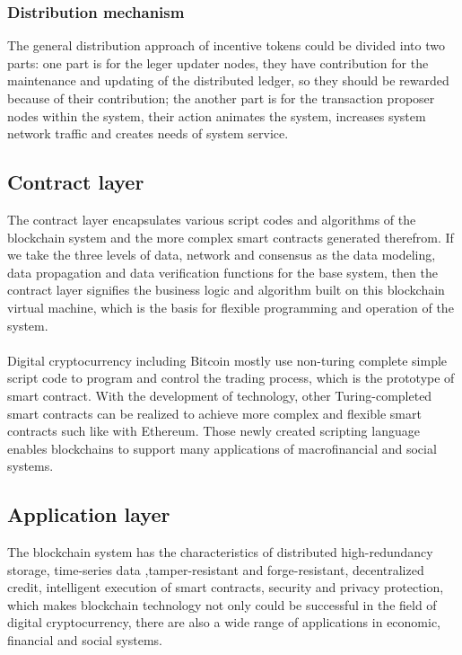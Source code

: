 \documentclass[doublespacing]{bmcart}
\begin{document}
\begin{CJK*}{UTF8}{gbsn}
\subsubsection*{Distribution mechanism}
The general distribution approach of incentive tokens could be divided into two parts: one part is for the leger updater nodes, they have contribution for the maintenance and updating of the distributed ledger, so they should be rewarded because of their contribution; the another part is for the transaction proposer nodes within the system, their action animates the system, increases system network traffic and creates needs of system service. 
\subsection{Contract layer}
The contract layer encapsulates various script codes and algorithms of the blockchain system and the more complex smart contracts generated therefrom. If we take the three levels of data, network and consensus as the data modeling, data propagation and data verification functions for the base system, then the contract layer signifies the business logic and algorithm built on this blockchain virtual machine, which is the basis for flexible programming and operation of the system. 
\paragraph{} Digital cryptocurrency including Bitcoin mostly use non-turing complete simple script code to program and control the trading process, which is the prototype of smart contract. With the development of technology, other Turing-completed smart contracts can be realized to achieve more complex and flexible smart contracts such like with Ethereum. Those newly created scripting language enables blockchains to support many applications of macrofinancial and social systems.
\subsection{Application layer}
The blockchain system has the characteristics of distributed high-redundancy storage, time-series data ,tamper-resistant and forge-resistant, decentralized credit, intelligent execution of smart contracts, security and privacy protection, which makes blockchain technology not only could be successful in the field of digital cryptocurrency, there are also a wide range of applications in economic, financial and social systems.


\end{CJK*}
\end{document}
